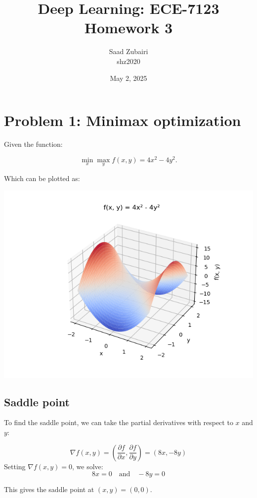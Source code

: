 \documentclass[11pt]{article}
\title{
    \vspace{3em}
    \textbf{Deep Learning: ECE-7123}\\
    Homework 3
    \vspace{1em}
}
\author{
    Saad Zubairi \\ 
    shz2020 \\
    \vspace{1em}
}
\date{May 2, 2025}
\begin{document}
\maketitle	
\pagebreak

\tableofcontents

\pagebreak

\section{Problem 1: Minimax optimization}

Given the function:

\[
\min_x \max_y f(x, y) = 4x^2 - 4y^2.
\]

Which can be plotted as:

\begin{center}
    \includegraphics[scale=0.5]{Q1/plot.png}
\end{center}

\subsection{Saddle point}

To find the saddle point, we can take the partial derivatives with respect to \(x\) and \(y\):

\[
\nabla f(x, y) = \left( \frac{\partial f}{\partial x}, \frac{\partial f}{\partial y} \right) = (8x, -8y)
\]
Setting \(\nabla f(x, y) = 0\), we solve:
\[
8x = 0 \quad \text{and} \quad -8y = 0
\]

This gives the saddle point at \((x, y) = (0, 0)\).
\end{document}
